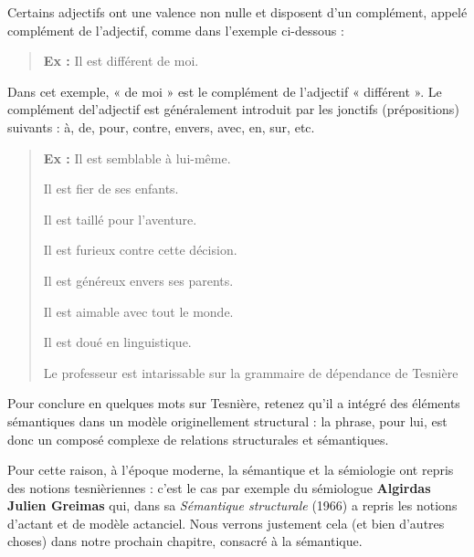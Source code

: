 Certains adjectifs ont une valence non nulle et disposent d’un complément, appelé complément de l’adjectif, comme dans l’exemple ci-dessous :
\begin{quote}\textbf{Ex :} Il est différent de moi.\end{quote}
Dans cet exemple, « de moi » est le complément de l’adjectif « différent ». Le complément del’adjectif est généralement introduit par les jonctifs (prépositions) suivants : à, de, pour, contre, envers, avec, en, sur, etc.
\begin{quote}
\textbf{Ex :} Il est semblable à lui-même.\par
Il est fier de ses enfants.\par
Il est taillé pour l’aventure.\par
Il est furieux contre cette décision.\par
Il est généreux envers ses parents.\par
Il est aimable avec tout le monde.\par
Il est doué en linguistique.\par
Le professeur est intarissable sur la grammaire de dépendance de Tesnière
\end{quote}
Pour conclure en quelques mots sur Tesnière, retenez qu’il a intégré des éléments sémantiques dans un modèle originellement structural : la phrase, pour lui, est donc un composé complexe de relations structurales et sémantiques.

Pour cette raison, à l’époque moderne, la sémantique et la sémiologie ont repris des notions tesnièriennes : c’est le cas par exemple du sémiologue \textbf{Algirdas Julien Greimas} qui, dans sa \textit{Sémantique structurale} (1966) a repris les notions d’actant et de modèle actanciel. Nous verrons justement cela (et bien d’autres choses) dans notre prochain chapitre, consacré à la sémantique.

